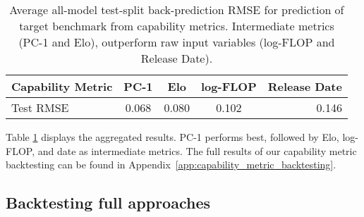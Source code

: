 \begin{table}[H]
    \begin{center}
        \begin{scriptsize}
            \setlength{\tabcolsep}{8.5pt}
            \begin{tabular}{lcccr}
                 \toprule
                 Capability Metric & PC-1 & Elo & log-FLOP & Release Date \\
                 \midrule
                 Test RMSE & 0.068 & 0.080 & 0.102 & 0.146 \\
                \bottomrule                     
            \end{tabular}
        \end{scriptsize}
    \end{center}
    \vskip -0.1in
    \caption{Average all-model test-split back-prediction RMSE for prediction of target benchmark from capability metrics. Intermediate metrics (PC-1 and Elo), outperform raw input variables (log-FLOP and Release Date).}
    \label{table:rmse_capability_metrics}
\end{table}

Table \ref{table:rmse_capability_metrics} displays the aggregated results. 
PC-1 performs best, followed by Elo, log-FLOP, and date as intermediate metrics. 
The full results of our capability metric backtesting can be found in Appendix~\ref{app:capability_metric_backtesting}.

\subsection{Backtesting full approaches}
\label{subsec:backtest_full_approaches}

\begin{figure*}[!htb]
    \centering
    \vskip -0.1in
    \caption{
        Visualization of backtesting forecasts for MMLU-PRO using the full method.
        We split the data into 4 parts with an equal number of models. We then fit a full path on split 1 and test on split 2, fit on 1 \& 2, and predict on 3, and so forth. 
        \textbf{Top:} Comparing predicted to actual performance. Frontier models are marked with stars. 
        \textbf{Bottom:} Average RMSE over frontier models. Bars are colored by the split they predict.
    }
    \label{fig:path_backtest}
\end{figure*}

